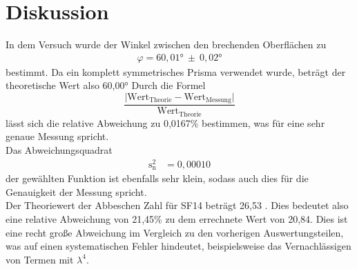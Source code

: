 \section{Diskussion}
\label{sec:Diskussion}
In dem Versuch wurde der Winkel zwischen den brechenden Oberflächen zu
\begin{align*}
  \varphi = 60,01° \: \pm \: 0,02 °
\end{align*}
bestimmt. Da ein komplett symmetrisches Prisma verwendet wurde, beträgt der
theoretische Wert also 60,00°
Durch die Formel
\begin{equation*}
  \frac{\lvert \text{Wert}_{\text{Theorie}}-\text{Wert}_{\text{Messung}}\rvert}{\text{Wert}_{\text{Theorie}}}
  \label{eqn:abw}
\end{equation*}
lässt sich die relative Abweichung zu 0,0167\% bestimmen, was für eine sehr genaue
Messung spricht. \\
Das Abweichungsquadrat
\begin{align*}
  \text{s}_{\text{n}}^2 &= 0,00010
\end{align*}
der gewählten Funktion ist ebenfalls sehr klein, sodass auch dies für die Genauigkeit der
Messung spricht. \\
Der Theoriewert der Abbeschen Zahl für SF14 beträgt 26,53 \cite{Abbe}.
Dies bedeutet also eine relative Abweichung von 21,45\%
zu dem errechnete Wert von 20,84. Dies ist eine recht große Abweichung im Vergleich
zu den vorherigen Auswertungsteilen, was auf einen systematischen Fehler hindeutet,
beispielsweise das Vernachlässigen von Termen mit $\lambda^4$.
